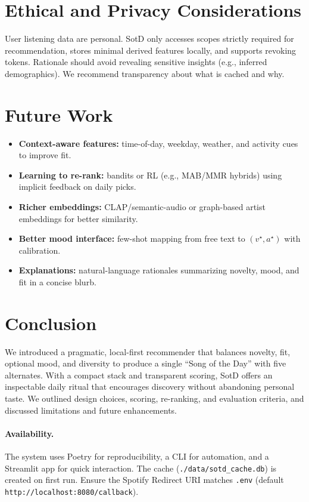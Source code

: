 \documentclass[11pt]{article}
\begin{document}
\section{Ethical and Privacy Considerations}
User listening data are personal. SotD only accesses scopes strictly required for recommendation, stores minimal derived features locally, and supports revoking tokens. Rationale should avoid revealing sensitive insights (e.g., inferred demographics). We recommend transparency about what is cached and why.

\section{Future Work}
\begin{itemize}[leftmargin=*]
  \item \textbf{Context-aware features:} time-of-day, weekday, weather, and activity cues to improve fit.
  \item \textbf{Learning to re-rank:} bandits or RL (e.g., MAB/MMR hybrids) using implicit feedback on daily picks.
  \item \textbf{Richer embeddings:} CLAP/semantic-audio or graph-based artist embeddings for better similarity.
  \item \textbf{Better mood interface:} few-shot mapping from free text to $(v^\star,a^\star)$ with calibration.
  \item \textbf{Explanations:} natural-language rationales summarizing novelty, mood, and fit in a concise blurb.
\end{itemize}

\section{Conclusion}
We introduced a pragmatic, local-first recommender that balances novelty, fit, optional mood, and diversity to produce a single ``Song of the Day'' with five alternates. With a compact stack and transparent scoring, SotD offers an inspectable daily ritual that encourages discovery without abandoning personal taste. We outlined design choices, scoring, re-ranking, and evaluation criteria, and discussed limitations and future enhancements.

\paragraph{Availability.} The system uses Poetry for reproducibility, a CLI for automation, and a Streamlit app for quick interaction. The cache (\texttt{./data/sotd\_cache.db}) is created on first run. Ensure the Spotify Redirect URI matches \texttt{.env} (default \texttt{http://localhost:8080/callback}).
\end{document}
